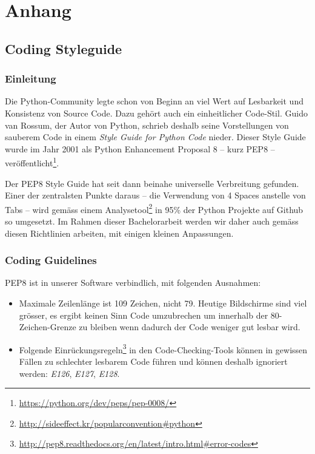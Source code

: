 \chapter{Anhang}

\section{Coding Styleguide}
\label{anhang:coding-styleguide}

\subsection{Einleitung}

Die Python-Community legte schon von Beginn an viel Wert auf Lesbarkeit und
Konsistenz von Source Code. Dazu gehört auch ein einheitlicher Code-Stil.  Guido
van Rossum, der Autor von Python, schrieb deshalb seine Vorstellungen von
sauberem Code in einem \textit{Style Guide for Python Code} nieder. Dieser Style
Guide wurde im Jahr 2001 als Python Enhancement Proposal 8 -- kurz PEP8 --
veröffentlicht\footnote{\url{https://python.org/dev/peps/pep-0008/}}.

Der PEP8 Style Guide hat seit dann beinahe universelle Verbreitung gefunden.
Einer der zentralsten Punkte daraus -- die Verwendung von 4 Spaces anstelle von
Tabs -- wird gemäss einem
Analysetool\footnote{\url{http://sideeffect.kr/popularconvention\#python}} in
95\% der Python Projekte auf Github so umgesetzt. Im Rahmen dieser Bachelorarbeit
werden wir daher auch gemäss diesen Richtlinien arbeiten, mit einigen kleinen
Anpassungen.

\subsection{Coding Guidelines}

PEP8 ist in unserer Software verbindlich, mit folgenden Ausnahmen:

\begin{itemize}
	\item Maximale Zeilenlänge ist 109 Zeichen, nicht 79. Heutige Bildschirme sind
		viel grösser, es ergibt keinen Sinn Code umzubrechen um innerhalb der
		80-Zeichen-Grenze zu bleiben wenn dadurch der Code weniger gut lesbar wird.
	\item Folgende
		Einrückungsregeln\footnote{\url{http://pep8.readthedocs.org/en/latest/intro.html\#error-codes}}
		in den Code-Checking-Tools können in gewissen Fällen zu schlechter lesbarem
		Code führen und können deshalb ignoriert werden: \textit{E126},
		\textit{E127}, \textit{E128}.
\end{itemize}


